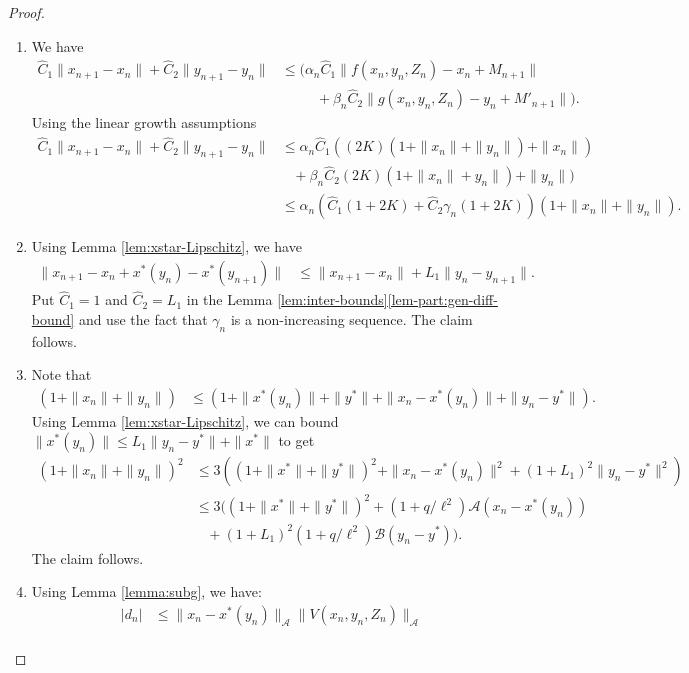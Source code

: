 \documentclass[letterpaper, 10 pt, conference]{ieeeconf}  %
\theoremstyle{definition}
\theoremstyle{plain}
\newcommand{\xstar}{x^*}
\newcommand{\hC}{\hat{C}}
\newcommand{\Acal}{\mathcal{A}}
\newcommand{\Bcal}{\mathcal{B}}
\begin{document}
\begin{proof}
    \begin{enumerate}[label=(\alph*)]
        \item We have
    \begin{align*}
        \hC_1\|x_{n+1}-x_n\|+\hC_2\|y_{n+1}-y_n\|
        &\leq \Bigg(\alpha_n\hC_1\|f(x_n, y_n, Z_n)-x_n+M_{n+1}\|\\
        &\;\;\;\;\;\;\;\;\;+\beta_n\hC_2\|g(x_n,y_n,Z_n)- y_n+ M'_{n+1}\|\Bigg).
    \end{align*}
    Using the linear growth assumptions
    \begin{align*}
        \hC_1\|x_{n+1}-x_n\|+\hC_2\|y_{n+1}-y_n\|
        &\leq \alpha_n\hC_1((2K)(1+\|x_n\|+\|y_n\|)+\|x_n\|)\\
        &\;\;\;+\beta_n\hC_2(2K)(1+\|x_n\|+y_n\|)+\|y_n\|)\\
        &\leq \alpha_n\left(\hC_1(1+2K)+\hC_2\gamma_n(1+2K)\right)(1+\|x_n\|+\|y_n\|).
    \end{align*}
    \item     Using Lemma \ref{lem:xstar-Lipschitz}, we have
    \begin{align*}
        \|x_{n+1}-x_n+\xstar(y_n)-\xstar(y_{n+1})\|
        &\leq \|x_{n+1}-x_n\|+L_1\|y_n-y_{n+1}\|.
    \end{align*}
    Put $\hC_1=1$ and $\hC_2=L_1$ in the Lemma \ref{lem:inter-bounds}\ref{lem-part:gen-diff-bound} and use the fact that $\gamma_n$ is a non-increasing sequence. The claim follows.
    \item Note that
    \begin{align*}
        (1+\|x_n\|+\|y_n\|)
        &\leq (1+\|x^*(y_n)\|+\|y^*\|+\|x_n-x^*(y_n)\|+\|y_n-y^*\|).
    \end{align*}
    Using Lemma \ref{lem:xstar-Lipschitz}, we can bound $\|x^*(y_n)\|\leq L_1\|y_n-y^*\|+\|x^*\|$ to get
    \begin{align*}
        (1+\|x_n\|+\|y_n\|)^2&\leq 3((1+\|x^*\|+\|y^*\|)^2+\|x_n-x^*(y_n)\|^2+(1+L_1)^2\|y_n-y^*\|^2)\\
        &\leq 3((1+\|x^*\|+\|y^*\|)^2+(1+q/\ell^2)\Acal(x_n-x^*(y_n))\\
        &\;\;\;+(1+L_1)^2(1+q/\ell^2)\Bcal(y_n-y^*)).
    \end{align*}
    The claim follows. 
    \item Using Lemma \ref{lemma:subg}, we have:
    \begin{align*}
        |d_n|&\leq \|x_n-\xstar(y_n)\|_\Acal\|V(x_n,y_n,Z_n)\|_\Acal\\

\end{align*}
\end{enumerate}
\end{proof}
\end{document}
